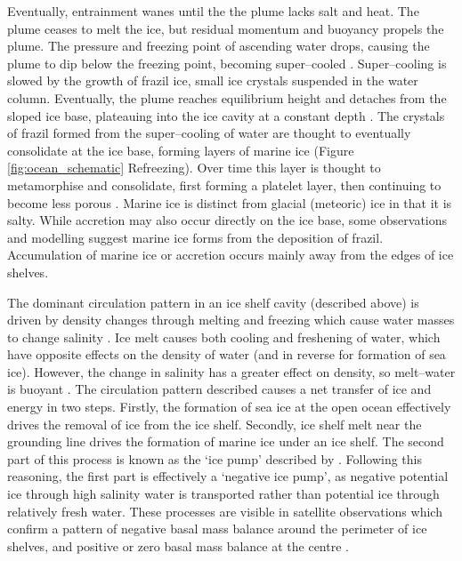 Eventually, entrainment wanes until the the plume lacks salt and heat. The plume ceases to melt the ice, but residual momentum and buoyancy propels the plume. The pressure and freezing point of ascending water drops, causing the plume to dip below the freezing point, becoming super--cooled \citep{holland2006effects}.  Super--cooling is slowed by the growth of frazil ice, small ice crystals suspended in the water column. Eventually, the plume reaches equilibrium height and detaches from the sloped ice base, plateauing into the ice cavity at a constant depth  \citep{hewitt2020subglacial}. 
The crystals of frazil formed from the super--cooling of water are thought to eventually consolidate at the ice base, forming layers of marine ice \cite[e.g.][]{fricker2001distribution} (Figure {\ref{fig:ocean_schematic}
} Refreezing).  Over time this layer is thought to metamorphise and consolidate, first forming  a platelet layer, then continuing to become less porous \citep{craven2009properties}. Marine ice is distinct from glacial (meteoric) ice in that it is salty. While accretion may also occur directly on the ice base, some observations \citep{vavnkova2021nature} and modelling \citep{bombosch1995modeling} suggest marine ice forms from the deposition of frazil.  Accumulation of marine ice or accretion occurs mainly away from the edges of ice shelves. 

The dominant circulation pattern in an ice shelf cavity (described above) is driven by density changes through melting and freezing which cause water masses to change salinity \citep{jacobs1979circulation}. Ice melt causes both cooling and freshening of water, which have opposite effects on the density of water (and in reverse for formation of sea ice). However, the change in salinity has a greater effect on density, so melt--water is buoyant \citep{jenkins1991one}. The circulation pattern described causes a net transfer of ice and energy in two steps. Firstly, the formation of sea ice at the open ocean effectively drives the removal of ice from the ice shelf. Secondly, ice shelf melt near the grounding line drives the formation of marine ice under an ice shelf.
The second part of this process is known as the `ice pump' described by \cite{lewis1986ice}. Following this reasoning, the first part is effectively a `negative ice pump', as negative potential ice through high salinity water is transported rather than potential ice through relatively fresh water.
These processes are visible in satellite observations which confirm a pattern of negative basal mass balance around the perimeter of ice shelves, and positive or zero basal mass balance at the centre \citep{rignot2013ice}. 



